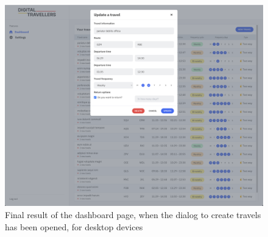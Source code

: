 \documentclass[./memory.tex]{subfiles}
\begin{document}
\begin{figure}[H]
	\centering
	\includegraphics[width=\textwidth]{./assets/results/desktop-update.png}
	\caption{Final result of the dashboard page, when the dialog to create
		travels has been opened, for desktop devices}
\end{figure}
\end{document}
